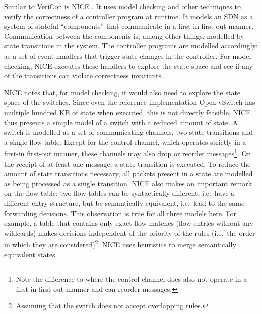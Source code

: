 Similar to VeriCon is NICE \cite{canini2012nice}.
It uses model checking and other techniques to verify the correctness of a controller program at runtime.
It models an SDN as a system of stateful ``components'' that communicate in a first-in first-out manner.
Communication between the components is, among other things, modelled by state transitions in the system.
The controller programs are modelled accordingly: as a set of event handlers that trigger state changes in the controller.
For model checking, NICE executes these handlers to explore the state space and see if any of the transitions can violate correctness invariants.

NICE notes that, for model checking, it would also need to explore the state space of the switches.
Since even the reference implementation Open vSwitch \cite{openvswitch} has multiple hundred KB of state when executed, this is not directly feasible.
NICE thus presents a simple model of a switch with a reduced amount of state.
A switch is modelled as a set of communicating channels, two state transitions and a single flow table.
Except for the control channel, which operates strictly in a first-in first-out manner, these channels may also drop or reorder messages\footnote{Note the difference to \cite{guha2013machine} where the control channel does also not operate in a first-in first-out manner and can reorder messages.}.
On the receipt of at least one message, a state transition is executed.
To reduce the amount of state transitions necessary, all packets present in a state are modelled as being processed as a single transition.
NICE also makes an important remark on the flow table: two flow tables can be syntactically different, i.e.\ have a different entry structure, but be semantically equivalent, i.e.\ lead to the same forwarding decisions.
This observation is true for all three models here.
For example, a table that contains only exact flow matches (flow entries without any wildcards) makes decisions independent of the priority of the rules (i.e.\ the order in which they are considered)\footnote{Assuming that the switch does not accept overlapping rules.}.
NICE uses heuristics to merge semantically equivalent states.


